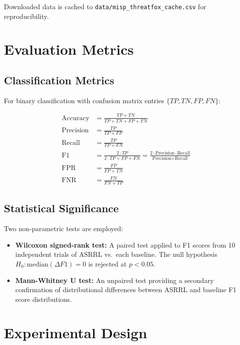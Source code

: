 \documentclass[12pt, letterpaper, oneside]{report}
\newcommand{\ASRRL}{\textsc{ASRRL}}
\begin{document}
Downloaded data is cached to \texttt{data/misp\_threatfox\_cache.csv} for reproducibility.


\section{Evaluation Metrics}
\label{sec:eval_metrics}

\subsection{Classification Metrics}

For binary classification with confusion matrix entries $\{TP, TN, FP, FN\}$:

\begin{align}
\text{Accuracy} &= \frac{TP + TN}{TP + TN + FP + FN} \label{eq:accuracy} \\[6pt]
\text{Precision} &= \frac{TP}{TP + FP} \label{eq:precision} \\[6pt]
\text{Recall} &= \frac{TP}{TP + FN} \label{eq:recall} \\[6pt]
\text{F1} &= \frac{2 \cdot TP}{2 \cdot TP + FP + FN} = \frac{2 \cdot \text{Precision} \cdot \text{Recall}}{\text{Precision} + \text{Recall}} \label{eq:f1} \\[6pt]
\text{FPR} &= \frac{FP}{FP + TN} \label{eq:fpr} \\[6pt]
\text{FNR} &= \frac{FN}{FN + TP} \label{eq:fnr}
\end{align}

\subsection{Statistical Significance}

Two non-parametric tests are employed:

\begin{itemize}
    \item \textbf{Wilcoxon signed-rank test:} A paired test applied to F1 scores from 10 independent trials of \ASRRL{} vs.\ each baseline. The null hypothesis $H_0: \text{median}(\Delta F1) = 0$ is rejected at $p < 0.05$.

    \item \textbf{Mann-Whitney U test:} An unpaired test providing a secondary confirmation of distributional differences between \ASRRL{} and baseline F1 score distributions.
\end{itemize}


\section{Experimental Design}
\label{sec:experimental_design}
\end{document}

